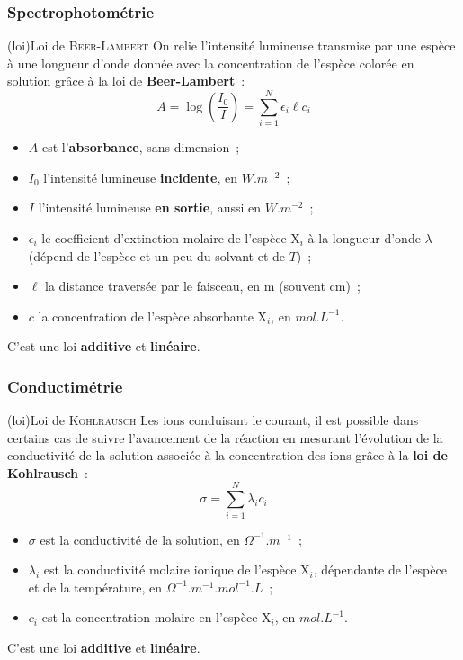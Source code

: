 \documentclass[../../main/main.tex]{subfiles}
\begin{document}
\subsubsection{Spectrophotométrie}
\begin{tcb}[label=loi:berrlambert](loi){Loi de \textsc{Beer-Lambert}}
	On relie l'intensité lumineuse transmise par une espèce à une longueur
	d'onde donnée avec la concentration de l'espèce colorée en solution grâce à
	la loi de \textbf{Beer-Lambert}~:
	\[
		\boxed{
			A = \log \left( \frac{I_0}{I} \right) = \sum_{i=1}^{N}\epsilon_i
			\ell c_i
		}
	\]
	\begin{itemize}
		\item $A$ est l'\textbf{absorbance}, sans dimension~;
		\item $I_0$ l'intensité lumineuse \textbf{incidente}, en $\si{W.m^{-2}}$~;
		\item $I$ l'intensité lumineuse \textbf{en sortie}, aussi en
		      $\si{W.m^{-2}}$~;
		\item $\epsilon_i$ le coefficient d'extinction molaire de l'espèce X$_i$
		      à la longueur d'onde $\lambda$ (dépend de l'espèce et un peu du
		      solvant et de $T$)~;
		\item $\ell$ la distance traversée par le faisceau, en \si{m} (souvent
		      \si{cm})~;
		\item $c$ la concentration de l'espèce absorbante X$_i$, en
		      $\si{mol.L^{-1}}$.
	\end{itemize}
	\begin{center}
		C'est une loi \textbf{additive} et \textbf{linéaire}.
	\end{center}
\end{tcb}

\subsubsection{Conductimétrie}
\begin{tcb}[label=loi:kohlrausch](loi){Loi de \textsc{Kohlrausch}}
	Les ions conduisant le courant, il est possible dans certains cas de suivre
	l'avancement de la réaction en mesurant l'évolution de la conductivité de la
	solution associée à la concentration des ions grâce à la \textbf{loi de
		Kohlrausch}~:
	\[\boxed{\sigma = \sum_{i=1}^{N}\lambda_ic_i}\]
	\begin{itemize}
		\item $\sigma$ est la conductivité de la solution, en
		      $\si{\Omega^{-1}.m^{-1}}$~;
		\item $\lambda_i$ est la conductivité molaire ionique de l'espèce X$_i$,
		      dépendante de l'espèce et de la température, en
		      $\si{\Omega^{-1}.m^{-1}.mol^{-1}.L}$~;
		\item $c_i$ est la concentration molaire en l'espèce X$_i$, en
		      $\si{mol.L^{-1}}$.
	\end{itemize}
	\begin{center}
		C'est une loi \textbf{additive} et \textbf{linéaire}.
	\end{center}
\end{tcb}
\end{document}
